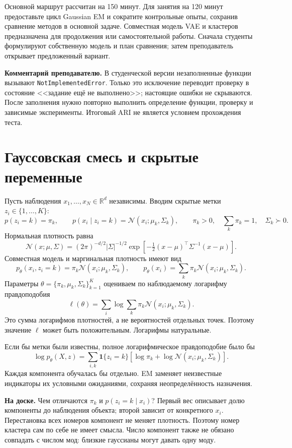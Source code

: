 \documentclass[11pt,a4paper]{article}
\newcommand{\R}{\mathbb R}
\newcommand{\Normal}{\mathcal N}
\newcommand{\board}[1]{\par\textbf{На доске.} #1\par}
\newcommand{\teach}[1]{\par\textbf{Комментарий преподавателю.} #1\par}
\begin{document}
Основной маршрут рассчитан на 150 минут. Для занятия на 120 минут
предоставьте цикл Gaussian EM и сократите контрольные опыты, сохранив
сравнение методов в основной задаче.
Совместная модель VAE и кластеров предназначена для продолжения или
самостоятельной работы. Сначала студенты формулируют собственную модель
и план сравнения; затем преподаватель открывает предложенный вариант.

\teach{В студенческой версии незаполненные функции вызывают
\texttt{NotImplementedError}. Только это исключение переводит проверку
в состояние <<задание ещё не выполнено>>; настоящие ошибки не скрываются.
После заполнения нужно повторно выполнить определение функции, проверку
и зависимые эксперименты. Итоговый ARI не является условием прохождения теста.}

\section{Гауссовская смесь и скрытые переменные}

Пусть наблюдения $x_1,\ldots,x_N\in\R^d$ независимы. Вводим
скрытые метки $z_i\in\{1,\ldots,K\}$:
\[
 p(z_i=k)=\pi_k,\qquad
 p(x_i\mid z_i=k)=\Normal(x_i;\mu_k,\Sigma_k),\qquad
 \pi_k>0,\quad\sum_k\pi_k=1,\quad\Sigma_k\succ0.
\]
Нормальная плотность равна
\[
 \Normal(x;\mu,\Sigma)=
 (2\pi)^{-d/2}|\Sigma|^{-1/2}
 \exp\!\left[-\tfrac12(x-\mu)^\top\Sigma^{-1}(x-\mu)\right].
\]
Совместная модель и маргинальная плотность имеют вид
\[
 p_\theta(x_i,z_i=k)=\pi_k\Normal(x_i;\mu_k,\Sigma_k),\qquad
 p_\theta(x_i)=\sum_k\pi_k\Normal(x_i;\mu_k,\Sigma_k).
\]
Параметры $\theta=\{\pi_k,\mu_k,\Sigma_k\}_{k=1}^K$ оцениваем по
наблюдаемому логарифму правдоподобия
\[
 \ell(\theta)=\sum_i\log\sum_k\pi_k\Normal(x_i;\mu_k,\Sigma_k).
\]
Это сумма логарифмов плотностей, а не вероятностей отдельных точек.
Поэтому значение $\ell$ может быть положительным. Логарифмы натуральные.

Если бы метки были известны, полное логарифмическое правдоподобие было бы
\[
 \log p_\theta(X,z)=\sum_{i,k}\mathbf1\{z_i=k\}
 [\log\pi_k+\log\Normal(x_i;\mu_k,\Sigma_k)].
\]
Каждая компонента обучалась бы отдельно. EM заменяет неизвестные индикаторы
их условными ожиданиями, сохраняя неопределённость назначения.

\board{Чем отличаются $\pi_k$ и $p(z_i=k\mid x_i)$? Первый вес описывает
долю компоненты до наблюдения объекта; второй зависит от конкретного $x_i$.
Перестановка всех номеров компонент не меняет плотность. Поэтому номер
кластера сам по себе не имеет смысла. Число компонент также не обязано
совпадать с числом мод: близкие гауссианы могут давать одну моду.}
\end{document}
